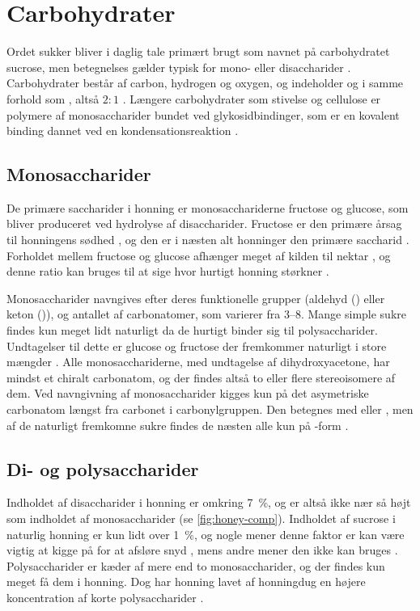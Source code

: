 \section{Carbohydrater}\label{sec:sugar}
Ordet sukker bliver i daglig tale primært brugt som navnet på carbohydratet sucrose, men betegnelses gælder typisk for mono- eller disaccharider \parencite{sugardeff}.
Carbohydrater består af carbon, hydrogen og oxygen, og indeholder  og  i samme forhold som , altså $2\!:\!1$ \parencite{basisB}.
Længere carbohydrater som stivelse og cellulose er polymere af monosaccharider bundet ved glykosidbindinger, som er en kovalent binding dannet ved en kondensationsreaktion \parencite{sugarbond}.
\subsection{Monosaccharider}
De primære saccharider i honning er monosacchariderne fructose og glucose, som bliver produceret ved hydrolyse af disaccharider.
Fructose er den primære årsag til honningens sødhed \parencite{fuctosehealth}, og den er i næsten alt honninger den primære saccharid \parencite{sugarhoney}.
Forholdet mellem fructose og glucose afhænger meget af kilden til nektar \parencite{geohoney}, og denne ratio kan bruges til at sige hvor hurtigt honning størkner \parencite{honeycrystal}.
\par Monosaccharider navngives efter deres funktionelle grupper (aldehyd () eller keton ()), og antallet af carbonatomer, som varierer fra \numrange{3}{8}.
Mange simple sukre findes kun meget lidt naturligt da de hurtigt binder sig til polysaccharider.
Undtagelser til dette er glucose og fructose der fremkommer naturligt i store mængder \parencite{physwoodplant}.
Alle monosacchariderne, med undtagelse af dihydroxyacetone, har mindst et chiralt carbonatom, og der findes altså to eller flere stereoisomere af dem.
Ved navngivning af monosaccharider kigges kun på det asymetriske carbonatom længst fra carbonet i carbonylgruppen.
Den betegnes med \iupac{\L} eller \iupac{\D}, men af de naturligt fremkomne sukre findes de næsten alle kun på \iupac{\D}-form \parencite{physwoodplant}.
\subsection{Di- og polysaccharider}
Indholdet af disaccharider i honning er omkring \qty{7}{\percent}, og er altså ikke nær så højt som indholdet af monosaccharider (se \cref{fig:honey-comp}).
Indholdet af sucrose i naturlig honning er kun lidt over \qty{1}{\percent}, og nogle mener denne faktor er kan være vigtig at kigge på for at afsløre snyd \parencite{saccharosehoney}, mens andre mener den ikke kan bruges \parencite{biochemprophoney}.
Polysaccharider er kæder af mere end to monosaccharider, og der findes kun meget få dem i honning. Dog har honning lavet af honningdug en højere koncentration af korte polysaccharider \parencite{sugarhoney}.
